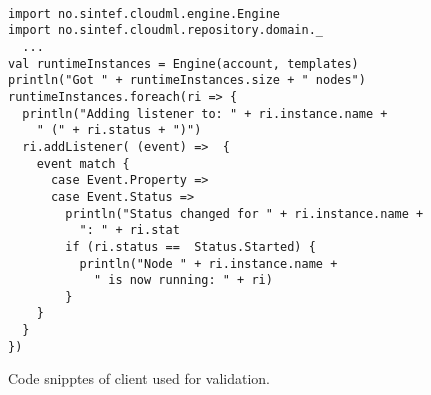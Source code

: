 \begin{figure}[tb]
  \begin{center}
    \begin{verbatim}

import no.sintef.cloudml.engine.Engine
import no.sintef.cloudml.repository.domain._
  ...
val runtimeInstances = Engine(account, templates)
println("Got " + runtimeInstances.size + " nodes")
runtimeInstances.foreach(ri => {
  println("Adding listener to: " + ri.instance.name + 
    " (" + ri.status + ")")
  ri.addListener( (event) =>  {
    event match {
      case Event.Property => 
      case Event.Status => 
        println("Status changed for " + ri.instance.name + 
          ": " + ri.stat
        if (ri.status ==  Status.Started) {
          println("Node " + ri.instance.name + 
            " is now running: " + ri)
        }
    }
  }
})
    \end{verbatim}
  \end{center}
  \caption{Code snipptes of client used for validation.}
  \label{list:validation-client}
\end{figure}

